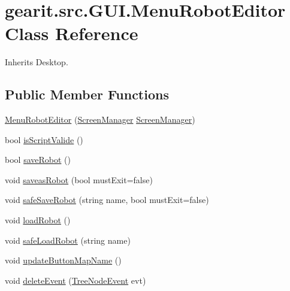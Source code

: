 \hypertarget{classgearit_1_1src_1_1_g_u_i_1_1_menu_robot_editor}{\section{gearit.\+src.\+G\+U\+I.\+Menu\+Robot\+Editor Class Reference}
\label{classgearit_1_1src_1_1_g_u_i_1_1_menu_robot_editor}
}


Inherits Desktop.

\subsection*{Public Member Functions}
\begin{DoxyCompactItemize}
\item 
\hyperlink{classgearit_1_1src_1_1_g_u_i_1_1_menu_robot_editor_aa07e514aaaa0c00e08adec3d7c3fe93d}{Menu\+Robot\+Editor} (\hyperlink{classgearit_1_1xna_1_1_screen_manager}{Screen\+Manager} \hyperlink{classgearit_1_1xna_1_1_screen_manager}{Screen\+Manager})
\item 
bool \hyperlink{classgearit_1_1src_1_1_g_u_i_1_1_menu_robot_editor_a4e251ee3777b735d52ac38d39dc86860}{is\+Script\+Valide} ()
\item 
bool \hyperlink{classgearit_1_1src_1_1_g_u_i_1_1_menu_robot_editor_af0a02fe9e0bed744f9590f6eceb8118a}{save\+Robot} ()
\item 
void \hyperlink{classgearit_1_1src_1_1_g_u_i_1_1_menu_robot_editor_aba5a285d4cc2f4c4113d9ab2bf453c45}{saveas\+Robot} (bool must\+Exit=false)
\item 
void \hyperlink{classgearit_1_1src_1_1_g_u_i_1_1_menu_robot_editor_a320b6d6a6fbd091595b2c7b4872130f5}{safe\+Save\+Robot} (string name, bool must\+Exit=false)
\item 
void \hyperlink{classgearit_1_1src_1_1_g_u_i_1_1_menu_robot_editor_aa9d70bced5bd4d8a7caa7c4bd76b72af}{load\+Robot} ()
\item 
void \hyperlink{classgearit_1_1src_1_1_g_u_i_1_1_menu_robot_editor_a4b0c4d8a8c8aab9c086cf19ac4197aa3}{safe\+Load\+Robot} (string name)
\item 
void \hyperlink{classgearit_1_1src_1_1_g_u_i_1_1_menu_robot_editor_a41250aed6571198ee4b688eec16c3f62}{update\+Button\+Map\+Name} ()
\item 
void \hyperlink{classgearit_1_1src_1_1_g_u_i_1_1_menu_robot_editor_ac996c0215993bf09ac9f2bbdc2bfc70d}{delete\+Event} (\hyperlink{classgearit_1_1src_1_1_g_u_i_1_1_tree_node_event}{Tree\+Node\+Event} evt)

\end{DoxyCompactItemize}
